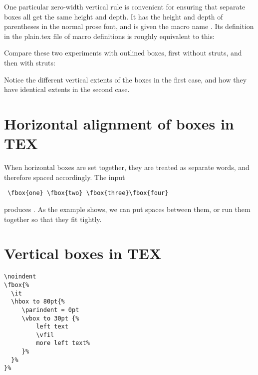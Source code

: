 {One particular zero-width vertical rule is convenient for ensuring that
separate boxes all get the same height and depth. It has the height and
depth of parentheses in the normal prose font, and is given the macro name
. Its definition in the plain.tex file of macro definitions is roughly
equivalent to this:

\begin{comment}
\begin{figure}[tbp]%
   \texttt{[image: ./graphics/ascender]}
   \caption{Boxes in \protect\TeX}
   \label{fig:ascender}
\end{figure}
\end{comment}

 \def \strut {\vrule height 8.5pt depth 3.5pt width 0pt}
\begin{teX}
  \def \strut {\vrule height 8.5pt depth 3.5pt width 0pt}
\end{teX}

Compare these two experiments with outlined boxes, first without struts,
and then with struts:




Notice the different vertical extents of the boxes in the first case, and how
they have identical extents in the second case.

\section{Horizontal alignment of boxes in TEX}

When horizontal boxes are set together, they are treated as separate words,
and therefore spaced accordingly. The input

\verb+ \fbox{one} \fbox{two} \fbox{three}\fbox{four}+  

produces    . As the example shows, we can put spaces
between them, or run them together so that they fit tightly.


\section{Vertical boxes in TEX}


\begin{minipage}{2.0in}
\begin{verbatim}
\noindent
\fbox{%
  \it
  \hbox to 80pt{%
     \parindent = 0pt
     \vbox to 30pt {%
         left text
         \vfil
         more left text%
     }%
  }%
}%
\end{verbatim}
\end{minipage}


}
